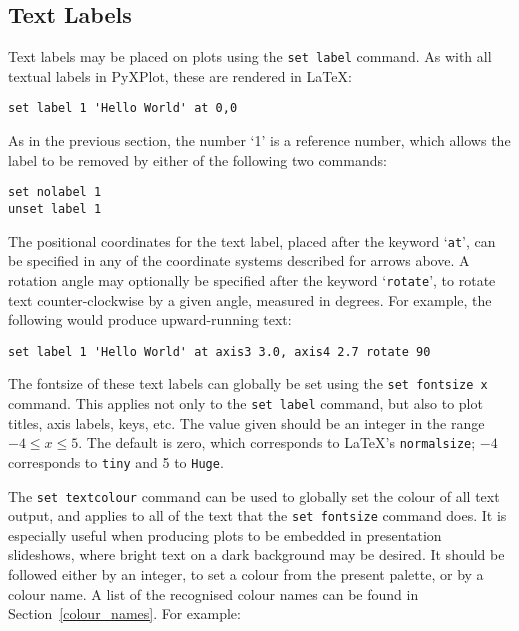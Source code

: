 \subsection{Text Labels}

Text labels may be placed on plots using the \texttt{set label}
command. As with all
textual labels in PyXPlot, these are rendered in \LaTeX:

\begin{verbatim}
set label 1 'Hello World' at 0,0
\end{verbatim}

As in the previous section, the number `1' is a reference number, which allows
the label to be removed by either of the following two commands:

\begin{verbatim}
set nolabel 1
unset label 1
\end{verbatim}

\noindent The positional coordinates for the text label, placed after the
keyword `\texttt{at}', can be specified in any of the coordinate systems
described for arrows above. A rotation angle may optionally be specified after
the keyword `{\tt rotate}', to rotate text counter-clockwise by a given
angle, measured in degrees. For example, the following would produce
upward-running text:

\begin{verbatim}
set label 1 'Hello World' at axis3 3.0, axis4 2.7 rotate 90
\end{verbatim}

 The fontsize of these text labels can globally be set using
the \texttt{set fontsize x} command. This applies not only to the \texttt{set
label} command, but also to plot titles, axis labels, keys, etc. The value
given should be an integer in the range $-4 \leq x \leq 5$. The default is
zero, which corresponds to \LaTeX's \texttt{normalsize}; $-4$ corresponds to
\texttt{tiny} and 5 to \texttt{Huge}.

 The \texttt{set textcolour} command
can be used to globally set the colour of all text output, and applies to all
of the text that the \texttt{set fontsize} command does. It is especially
useful when producing plots to be embedded in presentation slideshows, where
bright text on a dark background may be desired. It should be followed either
by an integer, to set a colour from the present palette, or by a colour name. A
list of the recognised colour names can be found in Section~\ref{colour_names}.
For example:

